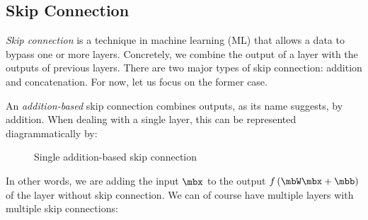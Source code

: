 \documentclass[11pt]{article}
\begin{document}
    \subsection{Skip Connection}

    \textit{Skip connection} is a technique in machine learning (ML) that allows a data to bypass one or more layers. Concretely, we combine the output of a layer with the outputs of previous layers. There are two major types of skip connection: addition and concatenation. For now, let us focus on the former case.

    An \textit{addition-based} skip connection combines outputs, as its name suggests, by addition. When dealing with a single layer, this can be represented diagrammatically by:
    
    \begin{figure}[H]
        \center
            \begin{center}
            \end{center}
        \caption{Single addition-based skip connection}
    \end{figure}

    \noindent In other words, we are adding the input $\mbx$ to the output $f\left( \mbW\mbx+\mbb \right)$ of the layer without skip connection. We can of course have multiple layers with multiple skip connections:
\end{document}
